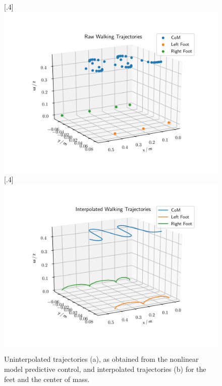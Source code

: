 \begin{figure}[h]
	\centering
	\subcaptionbox{}%
	[.4\linewidth]{\includegraphics[scale=.4]{chapters/03_background/img/raw_results.png}}
	\subcaptionbox{}%
	[.4\linewidth]{\includegraphics[scale=.4]{chapters/03_background/img/interpolated_results.png}}
	\caption{Uninterpolated trajectories (a), as obtained from the nonlinear model predictive control, and interpolated trajectories (b) for the feet and the center of mass.}
	\label{fig::313_ip}
\end{figure}

